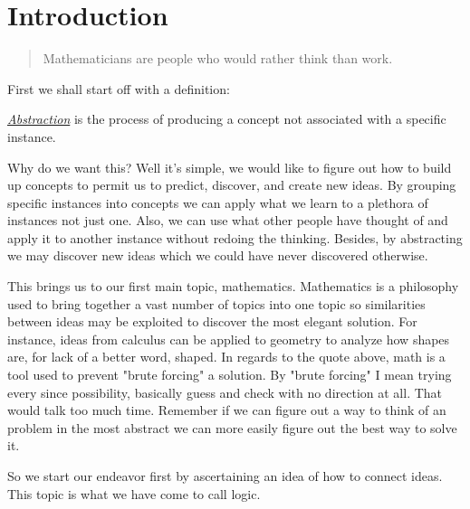 \chapter{Introduction}
    \begin{quote}
        Mathematicians are people who would rather think than work.\newline
    \end{quote}

    \bigskip

    First we shall start off with a definition:
    \begin{defn}
       \underline{\emph{Abstraction}} is the process of producing a concept not associated with a specific instance.
    \end{defn}
    Why do we want this?
    Well it's simple, we would like to figure out how to build up concepts to permit us to predict, discover, and create new ideas.
    By grouping specific instances into concepts we can apply what we learn to a plethora of instances not just one.
    Also, we can use what other people have thought of and apply it to another instance without redoing the thinking.
    Besides, by abstracting we may discover new ideas which we could have never discovered otherwise.
    
    This brings us to our first main topic, mathematics.
    Mathematics is a philosophy used to bring together a vast number of topics into one topic so similarities between ideas may be exploited to discover the most elegant solution.
    For instance, ideas from calculus can be applied to geometry to analyze how shapes are, for lack of a better word, shaped.
    In regards to the quote above, math is a tool used to prevent "brute forcing" a solution.
    By "brute forcing" I mean trying every since possibility, basically guess and check with no direction at all.
    That would talk too much time.
    Remember if we can figure out a way to think of an problem in the most abstract we can more easily figure out the best way to solve it.

    So we start our endeavor first by ascertaining an idea of how to connect ideas.
    This topic is what we have come to call logic.

    \lipsum
